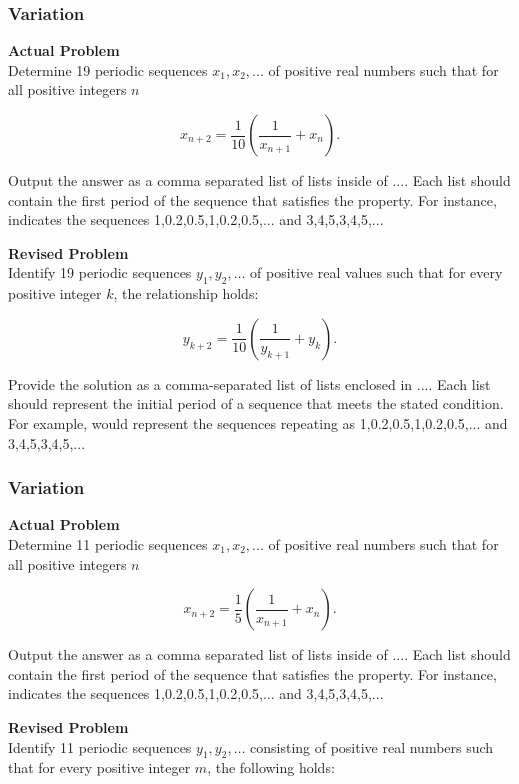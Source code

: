 \subsubsection{Variation}
\textbf{Actual Problem}\\
Determine 19 periodic sequences $x_1, x_2, ...$ of positive real numbers such that for all positive integers $n$

$$x_{n+2} = \frac{1}{10} \left(\frac{1}{x_{n+1}} + x_n\right).$$

Output the answer as a comma separated list of lists inside of $\boxed{...}$. Each list should contain the first period of the sequence that satisfies the property. For instance,  indicates the sequences 1,0.2,0.5,1,0.2,0.5,... and 3,4,5,3,4,5,...

\textbf{Revised Problem}\\
Identify 19 periodic sequences $y_1, y_2, \ldots$ of positive real values such that for every positive integer $k$, the relationship holds:

$$y_{k+2} = \frac{1}{10} \left(\frac{1}{y_{k+1}} + y_k\right).$$

Provide the solution as a comma-separated list of lists enclosed in $\boxed{...}$. Each list should represent the initial period of a sequence that meets the stated condition. For example,  would represent the sequences repeating as 1,0.2,0.5,1,0.2,0.5,... and 3,4,5,3,4,5,...

\subsubsection{Variation}
\textbf{Actual Problem}\\
Determine 11 periodic sequences $x_1, x_2, ...$ of positive real numbers such that for all positive integers $n$

$$x_{n+2} = \frac{1}{5} \left(\frac{1}{x_{n+1}} + x_n\right).$$

Output the answer as a comma separated list of lists inside of $\boxed{...}$. Each list should contain the first period of the sequence that satisfies the property. For instance,  indicates the sequences 1,0.2,0.5,1,0.2,0.5,... and 3,4,5,3,4,5,...

\textbf{Revised Problem}\\
Identify 11 periodic sequences $y_1, y_2, \ldots$ consisting of positive real numbers such that for every positive integer $m$, the following holds:

